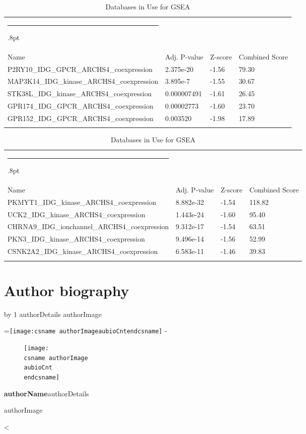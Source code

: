 \documentclass[3p,authoryear,preprint,12pt]{elsarticle}
\makeatletter
\newcounter{aubio}
\newcommand{\checkheight}[1]{%
  \par \penalty-100\begingroup%
  \setbox8=\hbox{#1}%
  \setlength{\dimen@}{\ht8}%
  \dimen@ii\pagegoal \advance\dimen@ii-\pagetotal
  \ifdim \dimen@>\dimen@ii
    \break
  \fi\endgroup}
\def\printBio{%
  \@tempcnta=0
   \loop
     \advance \@tempcnta by 1
     \def\aubioCnt{\the\@tempcnta}
     \setlength{\intextsep}{0pt}%
     \setlength{\columnsep}{10pt}%
     \newbox\boxa%
     \setbox\boxa\vbox{\csname authorDetails\aubioCnt\endcsname}
     \expandafter\ifx\csname authorImage\aubioCnt\endcsname\relax%
      \else%
       \checkheight{\texttt{[image: \\csname authorImage\\aubioCnt\\endcsname]}}
        \begin{figure}
         \texttt{[image: \\csname authorImage\\aubioCnt\\endcsname]}%
        \end{figure}\par
      \fi
     {\parindent0pt\textbf{\csname authorName\aubioCnt\endcsname}\csname authorDetails\aubioCnt\endcsname \par\bigskip%
     \expandafter\ifx\csname authorImage\aubioCnt\endcsname\relax\else%
      \ifdim\the\ht\boxa < 90pt\vskip\dimexpr(90pt -\the\ht\boxa-1pc)\fi%
     \fi}%
      \ifnum\@tempcnta < \theaubio
   \repeat
   }
\def\hlinewd#1{%
  \noalign{\ifnum0=`}\fi\hrule \@height #1%
  \futurelet\reserved@a\@xhline}
\def\tbltoprule{\hlinewd{.8pt}\\[-12pt]}
\def\tblbottomrule{\noalign{\vspace*{6pt}}\hline\noalign{\vspace*{2pt}}}
\def\tblmidrule{\noalign{\vspace*{6pt}}\hline\noalign{\vspace*{2pt}}}
\makeatother
\begin{document}
\begin{table}[!htbp]
	\caption{{Databases in Use for GSEA} }
	\label{tw-de478ae31cc6}
	\def\arraystretch{1}
	\ignorespaces 
	\centering 
	\begin{tabulary}{\linewidth}{p{\dimexpr.65\tabcolsep}p{\dimexpr.15\tabcolsep}p{\dimexpr.1\tabcolsep}p{\dimexpr.1\tabcolsep}}
		\tbltoprule Name & Adj. P-value & Z-score & Combined Score\\
		\tblmidrule
P2RY10\_IDG\_GPCR\_ARCHS4\_coexpression & 2.375e-20 & -1.56 & 79.30 \\
MAP3K14\_IDG\_kinase\_ARCHS4\_coexpression & 3.895e-7 & -1.55 & 30.67 \\
STK38L\_IDG\_kinase\_ARCHS4\_coexpression & 0.000007491 & -1.61 & 26.45 \\
GPR174\_IDG\_GPCR\_ARCHS4\_coexpression & 0.00002773 & -1.60 & 23.70 \\
GPR152\_IDG\_GPCR\_ARCHS4\_coexpression & 0.003520 & -1.98 & 17.89 \\
		\tblbottomrule
	\end{tabulary}\par 
\end{table}
\begin{table}[!htbp]
	\caption{{Databases in Use for GSEA} }
	\label{tw-de478ae31cc6}
	\def\arraystretch{1}
	\ignorespaces 
	\centering 
	\begin{tabulary}{\linewidth}{p{\dimexpr.65\tabcolsep}p{\dimexpr.15\tabcolsep}p{\dimexpr.1\tabcolsep}p{\dimexpr.1\tabcolsep}}
		\tbltoprule Name & Adj. P-value & Z-score & Combined Score\\
		\tblmidrule
PKMYT1\_IDG\_kinase\_ARCHS4\_coexpression & 8.882e-32 & -1.54 & 118.82 \\
UCK2\_IDG\_kinase\_ARCHS4\_coexpression & 1.443e-24 & -1.60 & 95.40 \\
CHRNA9\_IDG\_ionchannel\_ARCHS4\_coexpression & 9.312e-17 & -1.54 & 63.51 \\
PKN3\_IDG\_kinase\_ARCHS4\_coexpression & 9.496e-14 & -1.56 & 52.99 \\
CSNK2A2\_IDG\_kinase\_ARCHS4\_coexpression & 6.583e-11 & -1.46 & 39.83\\
		\tblbottomrule
	\end{tabulary}\par 
\end{table}








\section*{Author biography}\noindent

\printBio 
\end{document}
